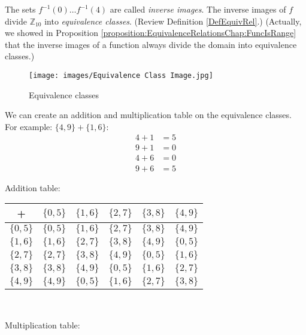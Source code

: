 \begin{example}
The sets $f^{-1}(0)\dots f^{-1}(4)$ are called \textit{inverse images}. The inverse images of $f$ divide ${\mathbb Z}_{10}$ into \textit{equivalence classes}.  (Review Definition \ref{DefEquivRel}.)
(Actually, we showed in Proposition \ref{proposition:EquivalenceRelationsChap:FuncIsRange} that the inverse images of a function always divide the domain into equivalence classes.)\\

\begin{figure}[H]
\begin{center}
\centerline {
\texttt{[image: images/Equivalence Class Image.jpg]} }
\end{center}
\caption{Equivalence classes}\label{fig:equiv_class}
\end{figure}

We can create an addition and multiplication table on the equivalence classes. For example: $\{4,9\}+\{1,6\}$:
\begin{align*}
4+1&=5\\
9+1&=0\\
4+6&=0\\
9+6&=5
\end{align*}

Addition table:

\begin{center}
\begin{tabular}{c|c|c|c|c|c}
+ & $\{0,5\}$ & $\{1,6\}$ & $\{2,7\}$ & $\{3,8\}$ & $\{4,9\}$ \\
\hline
$\{0,5\}$ & $\{0,5\}$ & $\{1,6\}$ & $\{2,7\}$ & $\{3,8\}$ & $\{4,9\}$ \\
\hline
$\{1,6\}$ & $\{1,6\}$ & $\{2,7\}$ & $\{3,8\}$ & $\{4,9\}$ & $\{0,5\}$ \\
\hline
$\{2,7\}$ & $\{2,7\}$ & $\{3,8\}$ & $\{4,9\}$ & $\{0,5\}$ & $\{1,6\}$ \\
\hline
$\{3,8\}$ & $\{3,8\}$ & $\{4,9\}$ & $\{0,5\}$ & $\{1,6\}$ & $\{2,7\}$ \\
\hline
$\{4,9\}$ & $\{4,9\}$ & $\{0,5\}$ & $\{1,6\}$ & $\{2,7\}$ & $\{3,8\}$ 
\end{tabular}\\
\end{center}

Multiplication table:


\end{example}
